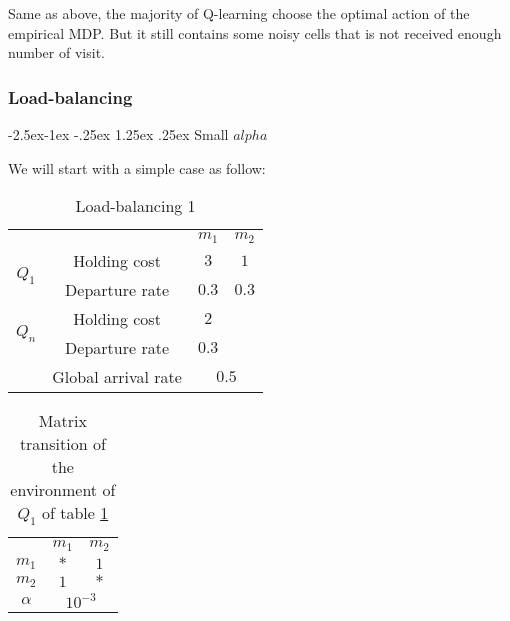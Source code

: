 \documentclass[
  a4paper, xcolor = usenames,dvipsnames]{article}
\makeatletter
\renewcommand\paragraph{\@startsection{paragraph}{4}{\z@}%
  {-2.5ex\@plus -1ex \@minus -.25ex}%
  {1.25ex \@plus .25ex}%
  {\normalfont\normalsize\bfseries}}
\theoremstyle{definition}
\theoremstyle{definition}
\theoremstyle{definition}
\theoremstyle{definition}
\theoremstyle{remark}
\makeatother
\begin{document}
Same as above, the majority of Q-learning choose the optimal action of the empirical MDP. But it still contains some noisy cells that is not received enough number of visit.

\hypertarget{load-balancing-1}{%
\subsubsection{Load-balancing}\label{load-balancing-1}}

\hypertarget{small-alpha-1}{%
\paragraph{\texorpdfstring{Small \(alpha\)}{Small alpha}}\label{small-alpha-1}}

We will start with a simple case as follow:

\begin{table}[!htbp]
\caption{Load-balancing 1}
\begin{center}
\begin{tabular}{c c c c}
    \hline
    \multicolumn{2}{c}{} & $m_{1}$ & $m_{2}$ \\
    \cline{2-4}
    \multirow{2}{*}{$Q_{1}$} &  Holding cost & $3$ & $1$ \\
    & Departure rate & $0.3$ & $0.3$ \\
    \cline{2-4}
    \multirow{2}{*}{$Q_{n}$} &  Holding cost & $2$ & \\
    & Departure rate & $0.3$ & \\
    \cline{2-4}
    & Global arrival rate & \multicolumn{2}{c}{$0.5$} \\
    \hline
\end{tabular}
\end{center}
\label{tab:lb-1}
\end{table}

\begin{table}[!htbp]
\caption{Matrix transition of the environment of $Q_{1}$ of table \ref{tab:lb-1}}
\begin{center}
\begin{tabular}{c c c}
    \hline
    & $m_{1}$ & $m_{2}$ \\
    $m_{1}$ & $*$ & $1$ \\
    $m_{2}$ & $1$ & $*$ \\
    \hline
    $\alpha$ & \multicolumn{2}{c}{$10^{-3}$} \\
    \hline
\end{tabular}
\end{center}
\label{tab:lb-1-mat-1}
\end{table}
\end{document}
